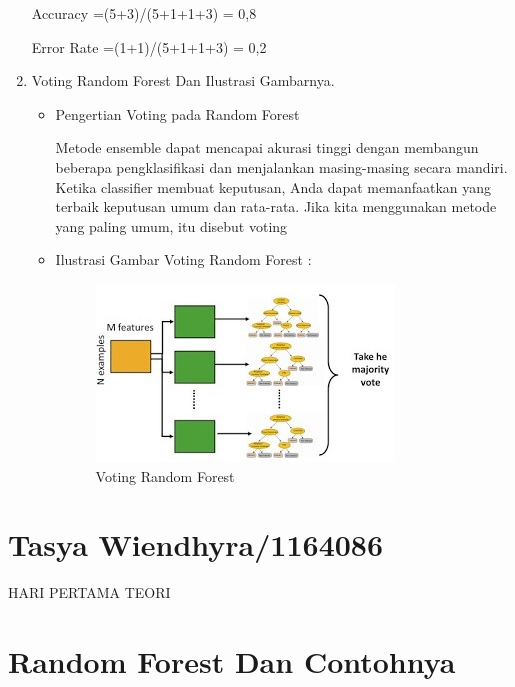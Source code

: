 \begin{enumerate}
Accuracy =(5+3)/(5+1+1+3) = 0,8

Error Rate =(1+1)/(5+1+1+3) = 0,2

\item Voting Random Forest Dan Ilustrasi Gambarnya.

\begin{itemize}
\item Pengertian Voting pada Random Forest

Metode ensemble dapat mencapai akurasi tinggi dengan membangun beberapa pengklasifikasi dan menjalankan masing-masing secara mandiri. Ketika classifier membuat keputusan, Anda dapat memanfaatkan yang terbaik keputusan umum dan rata-rata. Jika kita menggunakan metode yang paling umum, itu disebut voting

\item Ilustrasi Gambar Voting Random Forest :
\begin{figure}[ht]
\centering
\includegraphics[scale=0.8]{figures/Chapter3AnnisaFathoroni4.jpg}
\caption{Voting Random Forest}
\label{contoh}
\end{figure}
\end{itemize}
\end{enumerate}

\section{Tasya Wiendhyra/1164086}
HARI PERTAMA TEORI
\section{Random Forest Dan Contohnya}
